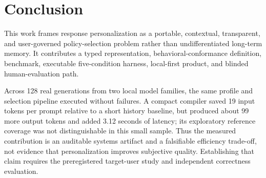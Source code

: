\section{Conclusion}
\label{sec:conclusion}

This work frames response personalization as a portable, contextual, transparent,
and user-governed policy-selection problem rather than undifferentiated long-term
memory. It contributes a typed representation, behavioral-conformance definition,
benchmark, executable five-condition harness, local-first product, and blinded
human-evaluation path.

Across 128 real generations from two local model families, the same profile and
selection pipeline executed without failures. A compact compiler saved 19 input
tokens per prompt relative to a short history baseline, but produced about 99 more
output tokens and added 3.12 seconds of latency; its exploratory reference coverage
was not distinguishable in this small sample. Thus the measured contribution is
an auditable systems artifact and a falsifiable efficiency trade-off, not evidence
that personalization improves subjective quality. Establishing that claim requires
the preregistered target-user study and independent correctness evaluation.
